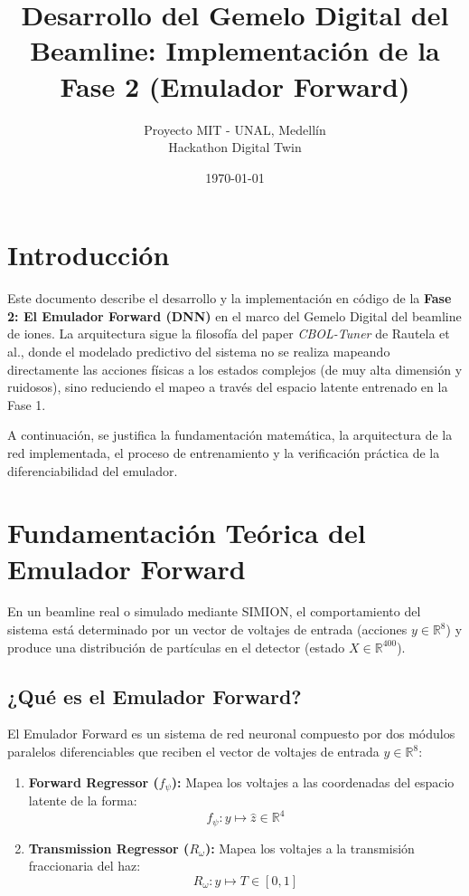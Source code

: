 \documentclass[12pt,letterpaper]{article}
\title{\textbf{Desarrollo del Gemelo Digital del Beamline: Implementación de la Fase 2 (Emulador Forward)}}
\author{Proyecto MIT - UNAL, Medellín \\ Hackathon Digital Twin}
\date{\today}
\begin{document}
\maketitle


\section{Introducción}
Este documento describe el desarrollo y la implementación en código de la \textbf{Fase 2: El Emulador Forward (DNN)} en el marco del Gemelo Digital del beamline de iones. La arquitectura sigue la filosofía del paper \textit{CBOL-Tuner} de Rautela et al., donde el modelado predictivo del sistema no se realiza mapeando directamente las acciones físicas a los estados complejos (de muy alta dimensión y ruidosos), sino reduciendo el mapeo a través del espacio latente entrenado en la Fase 1.

A continuación, se justifica la fundamentación matemática, la arquitectura de la red implementada, el proceso de entrenamiento y la verificación práctica de la diferenciabilidad del emulador.

\section{Fundamentación Teórica del Emulador Forward}
En un beamline real o simulado mediante SIMION, el comportamiento del sistema está determinado por un vector de voltajes de entrada (acciones $y \in \mathbb{R}^8$) y produce una distribución de partículas en el detector (estado $X \in \mathbb{R}^{400}$).

\subsection{¿Qué es el Emulador Forward?}
El Emulador Forward es un sistema de red neuronal compuesto por dos módulos paralelos diferenciables que reciben el vector de voltajes de entrada $y \in \mathbb{R}^8$:
\begin{enumerate}
    \item \textbf{Forward Regressor ($f_\psi$):} Mapea los voltajes a las coordenadas del espacio latente de la forma:
    \begin{equation}
        f_\psi: y \mapsto \hat{z} \in \mathbb{R}^4
    \end{equation}
    \item \textbf{Transmission Regressor ($R_\omega$):} Mapea los voltajes a la transmisión fraccionaria del haz:
    \begin{equation}
        R_\omega: y \mapsto T \in [0, 1]
    \end{equation}
\end{enumerate}
\end{document}
